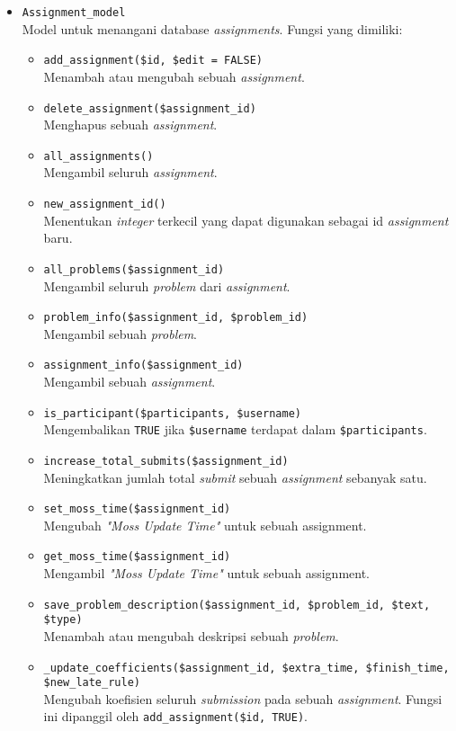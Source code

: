 \begin{itemize}
	\item \verb|Assignment_model| \\ Model untuk menangani database \textit{assignments}.
	Fungsi yang dimiliki:
	\begin{itemize}
		\item \verb|add_assignment($id, $edit = FALSE)|\\ Menambah atau mengubah sebuah \textit{assignment}.
		\item \verb|delete_assignment($assignment_id)| \\ Menghapus sebuah \textit{assignment}.
		\item \verb|all_assignments()| \\ Mengambil seluruh \textit{assignment}.
		\item \verb|new_assignment_id()| \\ Menentukan \textit{integer} terkecil yang dapat digunakan sebagai id \textit{assignment} baru.
		\item \verb|all_problems($assignment_id)| \\ Mengambil seluruh \textit{problem} dari \textit{assignment}.
		\item \verb|problem_info($assignment_id, $problem_id)| \\ Mengambil sebuah \textit{problem}.
		\item \verb|assignment_info($assignment_id)| \\ Mengambil sebuah \textit{assignment}.
		\item \verb|is_participant($participants, $username)| \\ Mengembalikan \verb|TRUE| jika \verb|$username| terdapat dalam \verb|$participants|.
		\item \verb|increase_total_submits($assignment_id)| \\ Meningkatkan jumlah total \textit{submit} sebuah \textit{assignment} sebanyak satu.
		\item \verb|set_moss_time($assignment_id)| \\ Mengubah \textit{"Moss Update Time"} untuk sebuah assignment.
		\item \verb|get_moss_time($assignment_id)| \\ Mengambil \textit{"Moss Update Time"} untuk sebuah assignment.
		\item \verb|save_problem_description($assignment_id, $problem_id, $text, $type)| \\ Menambah atau mengubah deskripsi sebuah \textit{problem}.
		\item \verb|_update_coefficients($assignment_id, $extra_time, $finish_time, $new_late_rule)| \\ Mengubah koefisien seluruh \textit{submission} pada sebuah \textit{assignment}. Fungsi ini dipanggil oleh \verb|add_assignment($id, TRUE)|.
	\end{itemize}
	

\end{itemize}
